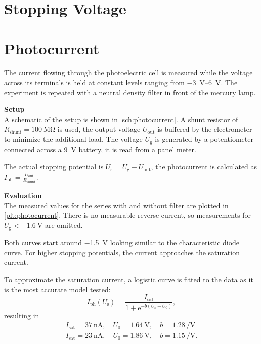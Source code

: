 \section{Stopping Voltage}%


\section{Photocurrent}%

The current flowing through the photoelectric cell is measured while the voltage across its terminals is held at constant levels ranging from \SIrange{-3}{6}{\volt}.
The experiment is repeated with a neutral density filter in front of the mercury lamp.

\textbf{Setup}\\
A schematic of the setup is shown in \autoref{sch:photocurrent}.
A shunt resistor of $R_\text{shunt} = \SI{100}{\mega\ohm}$ is used, the output voltage $U_\text{out}$ is buffered by the electrometer to minimize the additional load.
The voltage $U_\text{g}$ is generated by a potentiometer connected across a \SI{9}{\volt} battery, it is read from a panel meter.

The actual stopping potential is $U_\text{s} = U_\text{g} - U_\text{out}$, the photocurrent is calculated as $I_\text{ph} = \frac{U_\text{out}}{R_\text{shunt}}$.

\textbf{Evaluation}\\
The measured values for the series with and without filter are plotted in \autoref{plt:photocurrent}.
There is no measurable reverse current, so measurements for $U_\text{g} < \SI{-1.6}{\volt}$ are omitted.

Both curves start around \SI{-1.5}{\volt} looking similar to the characteristic diode curve.
For higher stopping potentials, the current approaches the saturation current.

To approximate the saturation current, a logistic curve is fitted to the data as it is the most accurate model tested:
\begin{equation*}
	I_\text{ph}(U_\text{s}) = \frac{I_\text{sat}}{1 + \mathrm{e}^{-b (U_\text{s} - U_0)}},
\end{equation*}
resulting in
\begin{gather*}
	I_\text{sat} = \SI{37}{\nA}, \quad U_0 = \SI{1.64}{\volt}, \quad b = \SI{1.28}{\per\volt} \tag{no filter}\\
	I_\text{sat} = \SI{23}{\nA}, \quad U_0 = \SI{1.86}{\volt}, \quad b = \SI{1.15}{\per\volt}. \tag{filter}\\
\end{gather*}

